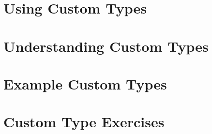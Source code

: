 







\clearpage
\section{Using Custom Types} %
\label{sec:using_custom_types}









\clearpage
\def\pageLang{none}
\section{Understanding Custom Types} %
\label{sec:understanding_custom_types}





\clearpage
\section{Example Custom Types} %
\label{sec:example_custom_types}





\clearpage
\section{Custom Type Exercises} %
\label{sec:custom_type_exercises}








